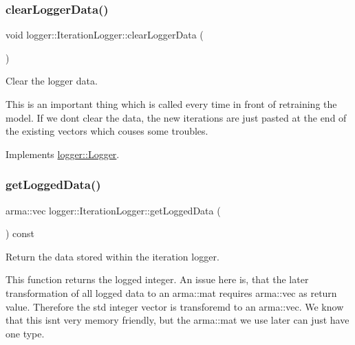 \subsubsection{\texorpdfstring{clear\+Logger\+Data()}{clearLoggerData()}}
{\footnotesize\ttfamily void logger\+::\+Iteration\+Logger\+::clear\+Logger\+Data (\begin{DoxyParamCaption}{ }\end{DoxyParamCaption})\hspace{0.3cm}{\ttfamily [virtual]}}



Clear the logger data. 

This is an important thing which is called every time in front of retraining the model. If we don\textquotesingle{}t clear the data, the new iterations are just pasted at the end of the existing vectors which couses some troubles. 

Implements \mbox{\hyperlink{classlogger_1_1_logger_a8c68db2430fa84b67528bfa6ae45a516}{logger\+::\+Logger}}.

\mbox{\label{classlogger_1_1_iteration_logger_ab073ed2a2806372ec823aa495112cf24}} 
\subsubsection{\texorpdfstring{get\+Logged\+Data()}{getLoggedData()}}
{\footnotesize\ttfamily arma\+::vec logger\+::\+Iteration\+Logger\+::get\+Logged\+Data (\begin{DoxyParamCaption}{ }\end{DoxyParamCaption}) const\hspace{0.3cm}{\ttfamily [virtual]}}



Return the data stored within the iteration logger. 

This function returns the logged integer. An issue here is, that the later transformation of all logged data to an {\ttfamily arma\+::mat} requires {\ttfamily arma\+::vec} as return value. Therefore the std integer vector is transforemd to an {\ttfamily arma\+::vec}. We know that this isn\textquotesingle{}t very memory friendly, but the {\ttfamily arma\+::mat} we use later can just have one type.

